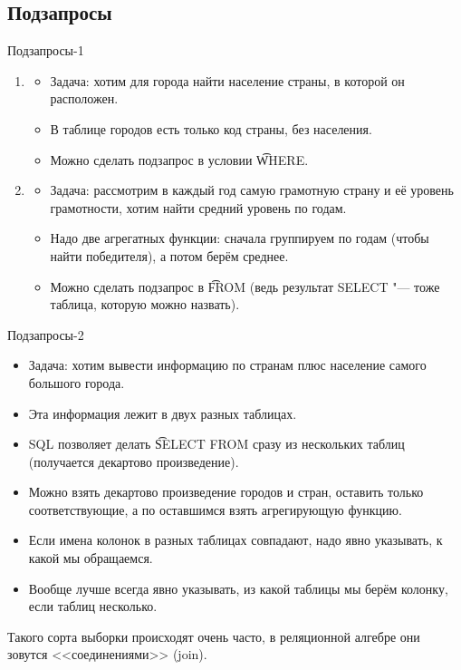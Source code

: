 \subsection{Подзапросы}
\begin{frame}
\end{frame}

\begin{frame}{Подзапросы-1}
	\begin{enumerate}
		\item
			\begin{itemize}
				\item Задача: хотим для города найти население страны, в которой он расположен.
				\item В таблице городов есть только код страны, без населения.
				\item Можно сделать подзапрос в условии \t{WHERE}.
			\end{itemize}
		\item
			\begin{itemize}
				\item Задача: рассмотрим в каждый год самую грамотную страну и её уровень грамотности, хотим найти средний уровень по годам.
				\item Надо две агрегатных функции: сначала группируем по годам (чтобы найти победителя), а потом берём среднее.
				\item Можно сделать подзапрос в \t{FROM} (ведь результат SELECT "--- тоже таблица, которую можно назвать).
			\end{itemize}
	\end{enumerate}
\end{frame}

\begin{frame}{Подзапросы-2}
	\begin{itemize}
		\item Задача: хотим вывести информацию по странам плюс население самого большого города.
		\item Эта информация лежит в двух разных таблицах.
		\item SQL позволяет делать \t{SELECT FROM} сразу из нескольких таблиц (получается декартово произведение).
		\item Можно взять декартово произведение городов и стран, оставить только соответствующие, а по оставшимся взять агрегирующую функцию.
		\item Если имена колонок в разных таблицах совпадают, надо явно указывать, к какой мы обращаемся.
		\item Вообще лучше всегда явно указывать, из какой таблицы мы берём колонку, если таблиц несколько.
	\end{itemize}
	Такого сорта выборки происходят очень часто, в реляционной алгебре они зовутся <<соединениями>> (join).
\end{frame}

